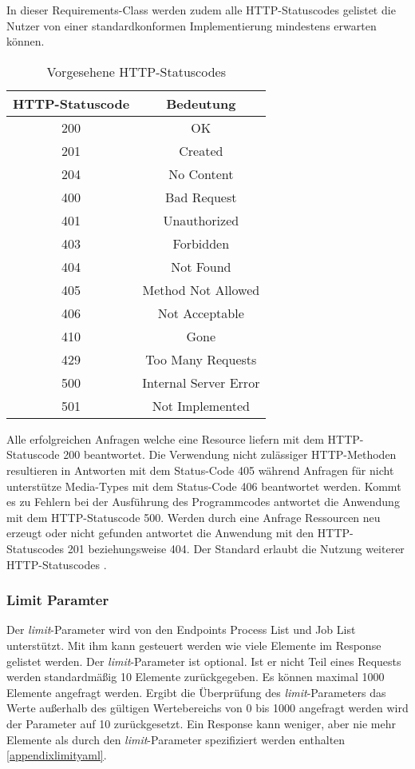 In dieser Requirements-Class werden zudem alle HTTP-Statuscodes gelistet die Nutzer von einer standardkonformen Implementierung mindestens erwarten können. 
\begin{table}[H]
    \caption{Vorgesehene HTTP-Statuscodes \cite{ogc_api_processes_core}}
    \centering
    \begin{tabular}{c c} 
        HTTP-Statuscode & Bedeutung\\ 
        \hline
        200 & OK\\
        201 & Created\\
        204 & No Content\\
        400 & Bad Request\\
        401 & Unauthorized\\
        403 & Forbidden\\
        404 & Not Found\\
        405 & Method Not Allowed\\
        406 & Not Acceptable\\
        410 & Gone\\
        429 & Too Many Requests\\
        500 & Internal Server Error\\
        501 & Not Implemented\\
    \end{tabular}\label{httpcodes}
\end{table}
Alle erfolgreichen Anfragen welche eine Resource liefern mit dem HTTP-Statuscode 200 beantwortet. Die Verwendung nicht zulässiger HTTP-Methoden resultieren 
in Antworten mit dem Status-Code 405 während Anfragen für nicht unterstütze Media-Types mit dem Status-Code 406 beantwortet werden. Kommt es zu Fehlern bei der Ausführung 
des Programmcodes antwortet die Anwendung mit dem HTTP-Statuscode 500. Werden durch eine Anfrage Ressourcen neu erzeugt oder nicht gefunden antwortet die Anwendung mit 
den HTTP-Statuscodes 201 beziehungsweise 404. Der Standard erlaubt die Nutzung weiterer HTTP-Statuscodes \cite{ogc_api_processes_core}.

\subsubsection{Limit Paramter}
Der \textit{limit}-Parameter wird von den Endpoints Process List und Job List unterstützt. Mit ihm kann gesteuert werden wie viele Elemente im Response gelistet werden. 
Der \textit{limit}-Parameter ist optional. Ist er nicht Teil eines Requests werden standardmäßig 10 Elemente zurückgegeben. Es können maximal 1000 Elemente angefragt werden.
Ergibt die Überprüfung des \textit{limit}-Parameters das Werte außerhalb des gültigen Wertebereichs von 0 bis 1000 angefragt werden wird der Parameter auf 10 zurückgesetzt. 
Ein Response kann weniger, aber nie mehr Elemente als durch den \textit{limit}-Parameter spezifiziert werden enthalten \ref{appendixlimityaml}. 

